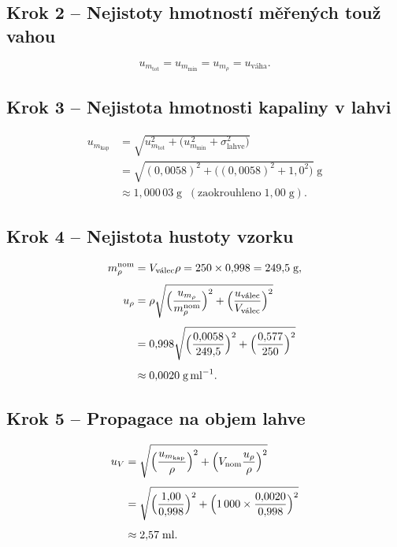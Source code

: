 \subsection{Krok 2 – Nejistoty hmotností měřených touž vahou}

\[
u_{m_\text{tot}} = u_{m_\text{min}} = u_{m_\rho}=u_{\text{váha}}.
\]

\subsection{Krok 3 – Nejistota hmotnosti kapaliny v lahvi}

\begin{align}
u_{m_\text{kap}}
  &= \sqrt{u_{m_\text{tot}}^{2}
        +\bigl(u_{m_\text{min}}^{\,2}+\sigma_{\text{lahve}}^{2}\bigr)} \\[2pt]
  &= \sqrt{(0{,}0058)^2 +\bigl((0{,}0058)^2 + 1{,}0^2\bigr)}\;\text{g} \\
  &\approx 1{,}000\,03\;\text{g}\;\;(\text{zaokrouhleno}\;1{,}00\;\text{g}).
\end{align}

\subsection{Krok 4 – Nejistota hustoty vzorku}

\begin{align}
m_\rho^{\text{nom}}
  &= V_{\text{válec}}\rho
   = 250 \times 0{,}998
   = 249{,}5\;\text{g},\\[4pt]
u_\rho
  &= \rho \sqrt{\Bigl(\frac{u_{m_\rho}}{m_\rho^{\text{nom}}}\Bigr)^2
                 +\Bigl(\frac{u_{\text{válec}}}{V_{\text{válec}}}\Bigr)^2} \\[4pt]
  &= 0{,}998 \sqrt{\Bigl(\frac{0{,}0058}{249{,}5}\Bigr)^2
                   +\Bigl(\frac{0{,}577}{250}\Bigr)^2} \\[4pt]
  &\approx 0{,}0020\;\text{g\,ml}^{-1}.
\end{align}

\subsection{Krok 5 – Propagace na objem lahve}

\begin{align}
u_V
  &= \sqrt{\Bigl(\frac{u_{m_\text{kap}}}{\rho}\Bigr)^2
           +\Bigl(V_{\text{nom}}\frac{u_\rho}{\rho}\Bigr)^2} \\[4pt]
  &= \sqrt{\Bigl(\frac{1{,}00}{0{,}998}\Bigr)^2
           +\Bigl(1\,000 \times \frac{0{,}0020}{0{,}998}\Bigr)^2} \\[4pt]
  &\approx 2{,}57\;\text{ml}.
\end{align}

